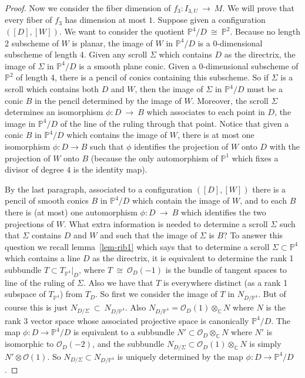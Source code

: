 \documentclass[twoside,12pt,reqno]{amsart}
\theoremstyle{plain}
\theoremstyle{definition}
\newcommand{\CC}{\mathbb{C}}
\newcommand{\PP}{\mathbb{P}}
\def\ps{\vspace{4pt}}
\newcommand{\OO}{\mathcal O}
\begin{document}
\begin{proof}
\ps

Now we consider the fiber dimension of $f_3:I_{3,U}~\rightarrow~M$.  We
will prove that every fiber of $f_3$ has dimension at most $1$.
Suppose given a configuration $([D],[W])$.  We want to consider the
quotient $\PP^4/D ~\cong~\PP^2$.  Because no length 2 subscheme of $W$ 
is planar, the image of $W$ in $\PP^4/D$ is a 0-dimensional subscheme
of length 4.  Given any scroll $\Sigma$ which contains $D$ as the
directrix, the image of $\Sigma$ in $\PP^4/D$ is a smooth plane conic.
Given a 0-dimensional subscheme of $\PP^2$ of length 4, there is a
pencil of conics containing this subscheme.  So if $\Sigma$ is a
scroll which contains both $D$ and $W$, then the image of $\Sigma$ in
$\PP^4/D$ must be a conic $B$ in the pencil determined by the image of
$W$.  Moreover, the scroll $\Sigma$ determines an isomorphism
$\phi:D~\rightarrow~B$ which associates to each point in $D$, the
image in $\PP^4/D$ of the line of the ruling through that point.
Notice that given a conic $B$ in $\PP^4/D$ which contains the image of 
$W$, there is at most one isomorphism $\phi:D\rightarrow B$ such that
$\phi$ identifies the projection of $W$ onto $D$ with the projection
of $W$ onto $B$ (because the only automorphism of $\PP^1$ which fixes
a divisor of degree $4$ is the identity map).

\ps

By the last paragraph, associated to a configuration $([D],[W])$ there 
is a pencil of smooth conics $B$ in $\PP^4/D$ which contain the image of $W$, 
and to each $B$ there is (at most) one automorphism $\phi:D~\rightarrow~
B$ which identifies the two projections of $W$.  What extra
information is needed to determine a scroll $\Sigma$ such that
$\Sigma$ contains $D$ and $W$ and such that the image of $\Sigma$ is
$B$?  To answer this question we recall lemma~\ref{lem-rib1} which
says that to determine a scroll $\Sigma\subset \PP^4$ which contains a 
line $D$ as the directrix, it is equivalent to determine the rank 1
subbundle $T\subset T_{\PP^4}|_D$, where $T~\cong~\OO_D(-1)$ is the
bundle of tangent spaces to line of the ruling of $\Sigma$.  Also we
have that $T$ is everywhere distinct (as a rank 1 subspace of
$T_{\PP^4}$) from $T_D$.  So first we consider the image of $T$ in
$N_{D/\PP^4}$.  But of course this is just
$N_{D/\Sigma}~\subset~N_{D/\PP^4}$.  Also $N_{D/\PP^4} =
\OO_D(1)\otimes_\CC N$ where $N$ is the rank 3 vector space whose
associated projective space is canonically $\PP^4/D$.  The map
$\phi:D\rightarrow \PP^4/D$ is equivalent to a subbundle $N'\subset
\OO_D\otimes_\CC N$ where $N'$ is isomorphic to $\OO_D(-2)$,  and the
subbundle $N_{D/\Sigma}\subset \OO_D(1)\otimes_\CC N$ is simply
$N'\otimes \OO(1)$.  So $N_{D/\Sigma}\subset N_{D/\PP^4}$ is uniquely
determined by the map $\phi:D\rightarrow \PP^4/D$.  


\end{proof}
\end{document}
